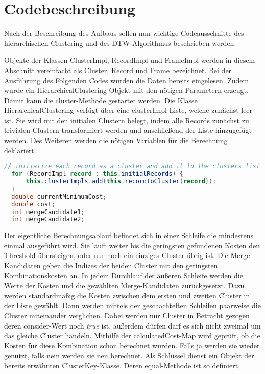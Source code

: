 \section{Codebeschreibung}
\label{5-Codebeschreibung}
Nach der Beschreibung des Aufbaus sollen nun wichtige Codeausschnitte des hierarchischen Clustering
und des \ac{DTW}-Algorithmus beschrieben werden.

Objekte der Klassen ClusterImpl, RecordImpl und FrameImpl werden in diesem Abschnitt
vereinfacht als Cluster, Record und Frame bezeichnet.
Bei der Ausführung des Folgenden Codes wurden die Daten bereits eingelesen.
Zudem wurde ein HierarchicalClustering-Objekt mit den nötigen Parametern erzeugt.
Damit kann die cluster-Methode gestartet werden.
Die Klasse HierarchicalClustering verfügt über eine clusterImpl-Liste,
welche zunächst leer ist.
Sie wird mit den initialen Clustern belegt,
indem alle Records zunächst zu trivialen Clustern transformiert werden
und anschließend der Liste hinzugefügt werden.
Des Weiteren werden die nötigen Variablen für die Berechnung deklariert.
\begin{lstlisting}[language=Java, caption=Cluster-Methode: Initialisierung.]
  // initialize each record as a cluster and add it to the clusters list
  for (RecordImpl record : this.initialRecords) {
      this.clusterImpls.add(this.recordToCluster(record));
  }
  double currentMinimumCost;
  double cost;
  int mergeCandidate1;
  int mergeCandidate2;
\end{lstlisting}
Der eigentliche Berechnungsablauf befindet sich in einer Schleife die mindestens einmal ausgeführt wird.
Sie läuft weiter bis die geringsten gefundenen Kosten den Threshold übersteigen, oder nur noch ein einziges Cluster übrig ist.
Die Merge-Kandidaten geben die Indizes der beiden Cluster mit den
geringsten Kombinationskosten an.
In jedem Durchlauf der äußeren Schleife werden die Werte der Kosten
und die gewählten Merge-Kandidaten zurückgesetzt.
Dazu werden standardmäßig die Kosten zwischen dem ersten und zweiten Cluster in der Liste gewählt.
Dann werden mittels der geschachtelten Schleifen paarweise die Cluster miteinander verglichen.
Dabei werden nur Cluster in Betracht gezogen deren consider-Wert noch \emph{true} ist,
außerdem dürfen darf es sich nicht zweimal um das gleiche Cluster handeln.
Mithilfe der calculatedCost-Map wird geprüft, ob die Kosten für diese Kombination schon berechnet wurden.
Falls ja werden sie wieder genutzt, falls nein werden sie neu berechnet.
Als Schlüssel dienst ein Objekt der bereits erwähnten ClusterKey-Klasse.
Deren equal-Methode ist so definiert,
